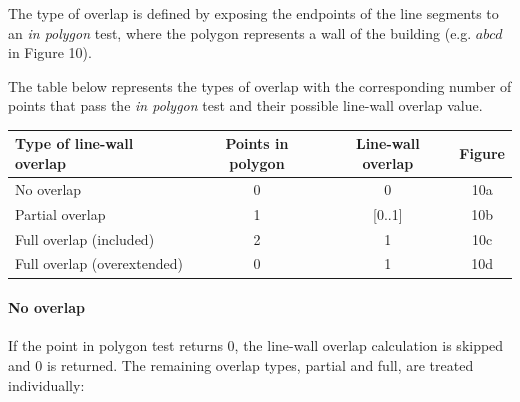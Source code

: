 
	The type of overlap is defined by exposing the endpoints of the line
	segments to an \emph{in polygon} test, where the polygon represents a 
	wall of the building (e.g. $abcd$ in Figure 10).

	The table below represents the types of overlap with the corresponding number of points
	that pass the \emph{in polygon} test and their possible line-wall overlap
	value.\\ 

	\begin{tabular}{|l||c|c|c|}
	\hline
	Type of line-wall overlap 			&	Points in polygon 			& Line-wall overlap & Figure \\
	\hline
	\hline
	No overlap					&	0					& 0		& 10a\\
	\hline
	Partial overlap 				&	1					& [0..1]	& 10b\\
	\hline
	Full overlap (included)		&	2					& 1		& 10c\\
	\hline
	Full overlap (overextended)		&  	0					& 1 		& 10d\\
	\hline
	\end{tabular}

	\paragraph{No overlap}
	If the point in polygon test returns 0, the line-wall overlap calculation
	is skipped and 0 is returned. The remaining overlap types, partial and full,
	are treated individually:\\




